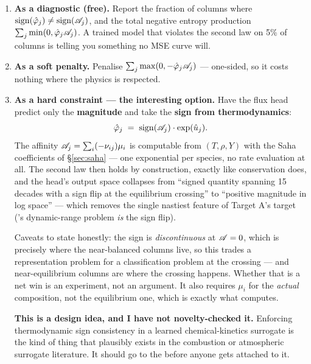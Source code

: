 \begin{enumerate}
\item \textbf{As a diagnostic (free).} Report the fraction of columns where
  $\mathrm{sign}(\hat{\varphi}_j) \ne \mathrm{sign}(\mathscr{A}_j)$, and the total
  negative entropy production $\sum_j \min(0, \hat{\varphi}_j \mathscr{A}_j)$. A trained
  model that violates the second law on 5\% of columns is telling you something
  no MSE curve will.
\item \textbf{As a soft penalty.} Penalise
  $\sum_j \max(0, -\hat{\varphi}_j\mathscr{A}_j)$ --- one-sided, so it costs nothing
  where the physics is respected.
\item \textbf{As a hard constraint --- the interesting option.} Have the flux
  head predict only the \textbf{magnitude} and take the \textbf{sign from
  thermodynamics}:
  \begin{equation}
  \hat{\varphi}_j \;=\; \mathrm{sign}(\mathscr{A}_j)\cdot \exp(\hat u_j).
  \label{eq:signfromaffinity}
  \end{equation}
  The affinity $\mathscr{A}_j = \sum_i(-\nu_{ij})\mu_i$ is computable from
  $(T, \rho, Y)$ with the Saha coefficients of \S\ref{sec:saha} --- one
  exponential per species, no rate evaluation at all. The second law then holds
  by construction, exactly like conservation does, and the head's output space
  collapses from ``signed quantity spanning 15 decades with a sign flip at the
  equilibrium crossing'' to ``positive magnitude in log space'' --- which
  removes the single nastiest feature of Target A's target
  ('s dynamic-range problem \emph{is} the sign flip).

  Caveats to state honestly: the sign is \emph{discontinuous} at $\mathscr{A} = 0$,
  which is precisely where the near-balanced columns live, so this trades a
  representation problem for a classification problem at the crossing --- and
  near-equilibrium columns are where the crossing happens. Whether that is a net
  win is an experiment, not an argument. It also requires $\mu_i$ for the
  \emph{actual} composition, not the equilibrium one, which is exactly what
   computes.

  \textbf{This is a design idea, and I have not novelty-checked it.} Enforcing
  thermodynamic sign consistency in a learned chemical-kinetics surrogate is the
  kind of thing that plausibly exists in the combustion or atmospheric surrogate
  literature. It should go to the  before anyone gets
  attached to it.
\end{enumerate}

